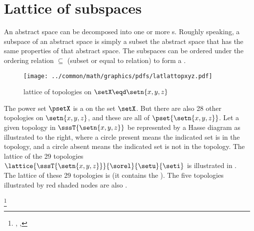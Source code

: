 \section{Lattice of subspaces}
An abstract space can be decomposed into one or more s. 
Roughly speaking, a subspace of an abstract space is simply a subset the abstract space 
that has the same properties of that abstract space.
The subspaces can be ordered under the ordering relation $\subseteq$ (subset or equal to relation)
to form a .

\begin{figure}[th]
\begin{center}
\texttt{[image: ../common/math/graphics/pdfs/latlattopxyz.pdf]}%
\end{center}
\caption{
  lattice of topologies on $\setX\eqd\setn{x,y,z}$ 
  \label{fig:set_latlat_top_xyz}
  }
\end{figure}


\begin{minipage}{\tw-45mm}
\begin{example}
\label{ex:set_lat_top_xyz}
\footnotemark
The power set $\psetX$ is a  on the set $\setX$.
But there are also 28 other topologies on $\setn{x,y,z}$, and these are all  of $\pset{\setn{x,y,z}}$.
Let a given topology in $\sssT{\setn{x,y,z}}$ be represented by a Hasse diagram 
as illustrated to the right, where a circle present means the indicated set is in the topology,
and a circle absent means the indicated set is not in the topology.
The lattice of the 29 topologies $\lattice{\sssT{\setn{x,y,z}}}{\sorel}{\setu}{\seti}$
is illustrated in . %
The lattice of these 29 topologies is  (it contains the ).
The five topologies illustrated by red shaded nodes
are also .
\end{example}%
\end{minipage}\hfill%
\footnote{%
  ,
  ,
  }%

